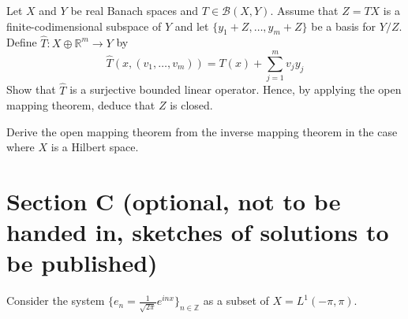 \documentclass[answers]{exam}
\begin{document}
\begin{questions}



\question%
Let $X$ and $Y$ be real Banach spaces and $T \in \mathcal{B}(X, Y)$. Assume that $Z=T X$ is a finite-codimensional subspace of $Y$ and let $\{y_{1}+Z, \ldots, y_{m}+Z\}$ be a basis for $Y / Z$. Define $\hat{T}: X \oplus \mathbb{R}^{m} \to Y$ by \[
	\hat{T}\left(x,\left(v_{1}, \ldots, v_{m}\right)\right)=T(x)+\sum_{j=1}^{m} v_{j} y_{j}
\] Show that $\hat{T}$ is a surjective bounded linear operator. Hence, by applying the open mapping theorem, deduce that $Z$ is closed.



\question%
Derive the open mapping theorem from the inverse mapping theorem in the case where $X$ is a Hilbert space.

\end{questions}



\section*{Section C \large(optional, not to be handed in, sketches of solutions to be published)}

\begin{questions}

\question%
Consider the system $\{e_{n}=\frac{1}{\sqrt{2 \pi}} e^{i n x}\}_{n \in \mathbb{Z}}$ as a subset of $X=L^{1}(-\pi, \pi)$.

\end{questions}
\end{document}

